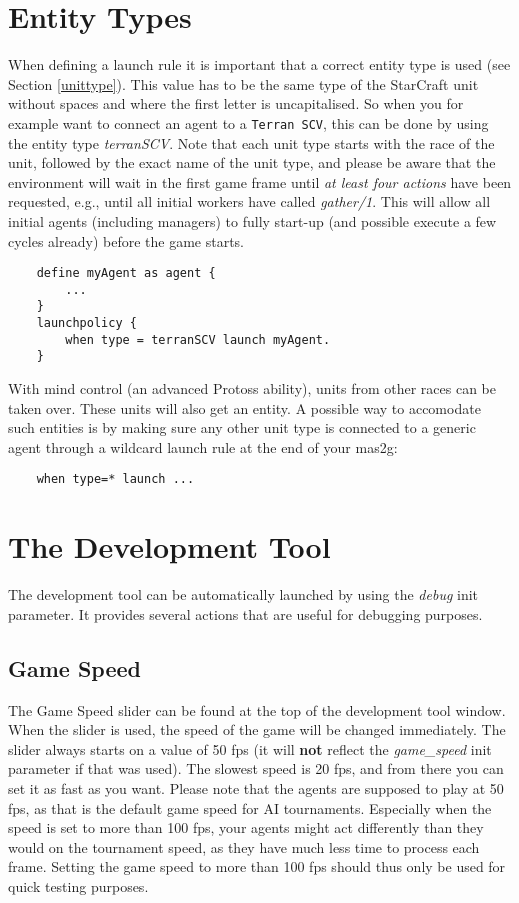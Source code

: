 \section{Entity Types}
When defining a launch rule it is important that a correct entity type is used (see Section \ref{unittype}). This value has to be the same type of the StarCraft unit without spaces and where the first letter is uncapitalised. So when you for example want to connect an agent to a \texttt{Terran SCV}, this can be done by using the entity type \textit{terranSCV}. Note that each unit type starts with the race of the unit, followed by the exact name of the unit type, and please be aware that the environment will wait in the first game frame until \textit{at least four actions} have been requested, e.g., until all initial workers have called \textit{gather/1}. This will allow all initial agents (including managers) to fully start-up (and possible execute a few cycles already) before the game starts.

\begin{verbatim}
    define myAgent as agent {
        ...
    }
    launchpolicy {
        when type = terranSCV launch myAgent.
    }
\end{verbatim}

\noindent With mind control (an advanced Protoss ability), units from other races can be taken over. These units will also get an entity. A possible way to accomodate such entities is by making sure any other unit type is connected to a generic agent through a wildcard launch rule at the end of your mas2g: \begin{verbatim}
    when type=* launch ...
\end{verbatim}

\pagebreak

\section{The Development Tool}
\label{development tool}
The development tool can be automatically launched by using the \textit{debug} init parameter. It provides several actions that are useful for debugging purposes.

\subsection{Game Speed}
The Game Speed slider can be found at the top of the development tool window. When the slider is used, the speed of the game will be changed immediately. The slider always starts on a value of 50 fps (it will \textbf{not} reflect the \textit{game\_speed} init parameter if that was used). The slowest speed is 20 fps, and from there you can set it as fast as you want. Please note that the agents are supposed to play at 50 fps, as that is the default game speed for AI tournaments. Especially when the speed is set to more than 100 fps, your agents might act differently than they would on the tournament speed, as they have much less time to process each frame. Setting the game speed to more than 100 fps should thus only be used for quick testing purposes.

